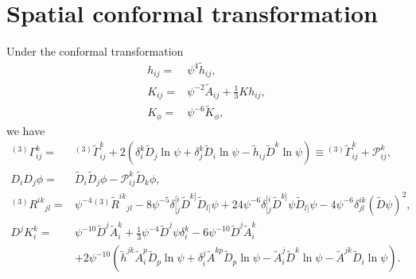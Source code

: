 \documentclass[%
notitlepage,
report,
nofootinbib,
 amsmath,amssymb,
 aps,
]{revtex4-1}
\begin{document}
\section{Spatial conformal transformation}
Under the conformal transformation
\begin{subequations}
\begin{align}
   h_{ij}
   =&
   \psi^4\tilde{h}_{ij}
   ,\\
   K_{ij}
   =&
   \psi^{-2}\tilde{A}_{ij}
   +
   \frac{1}{3}K h_{ij}
   ,\\
   K_{\phi}
   =&
   \psi^{-6}\tilde{K}_{\phi}
   ,
\end{align}
\end{subequations}
we have
\begin{subequations}
\begin{align}
   {}^{(3)}\Gamma^k_{ij}
   =&
   {}^{(3)}\tilde{\Gamma}^k_{ij}
   +
   2\left(
      \delta^k_i\tilde{D}_j\ln\psi
      +
      \delta^k_j\tilde{D}_i\ln\psi
      -
      \tilde{h}_{ij}\tilde{D}^k\ln\psi
   \right)
   \equiv
   {}^{(3)}\tilde{\Gamma}^k_{ij}
   +
   \mathcal{P}^k_{ij}
   ,\\
   D_iD_j\phi
   =&
   \tilde{D}_i\tilde{D}_j\phi
   -
   \mathcal{P}^k_{ij}\tilde{D}_k\phi
   ,\\
   {}^{(3)}R^{ik}{}_{jl}
   =&
   \psi^{-4}{}^{(3)}\tilde{R}^{ik}{}_{jl}
   -
   8\psi^{-5}\delta^{[i}_{[j}\tilde{D}^{k]}\tilde{D}_{l]}\psi
   +
   24\psi^{-6}\delta^{[i}_{[j}\tilde{D}^{k]}\psi\tilde{D}_{l]}\psi
   -
   4\psi^{-6}\delta^{ik}_{jl}\left(\tilde{D}\psi\right)^2
   ,\\
   D^jK_i^k
   =&
   \psi^{-10}\tilde{D}^j\tilde{A}_i^k
   +
   \frac{1}{3}\psi^{-4}\tilde{D}^j\psi\delta^k_i
   -
   6\psi^{-10}\tilde{D}^j\tilde{A}^k_i
   \nonumber\\
   &
   +
   2\psi^{-10}\left(
      \tilde{h}^{jk}\tilde{A}^p_i\tilde{D}_p\ln\psi
      +  
      \delta^j_i\tilde{A}^{kp}\tilde{D}_p\ln\psi
      -
      \tilde{A}^j_i\tilde{D}^k\ln\psi
      -
      \tilde{A}^{jk}\tilde{D}_i\ln\psi
   \right)
   .
\end{align}
\end{subequations}
\end{document}
